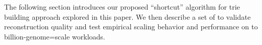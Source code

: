 The following section introduces our proposed ``shortcut'' algorithm for trie building approach explored in this paper. We then describe a set of to validate reconstruction quality and test empirical scaling behavior and performance on to billion-genome=scale workloads.

% 








